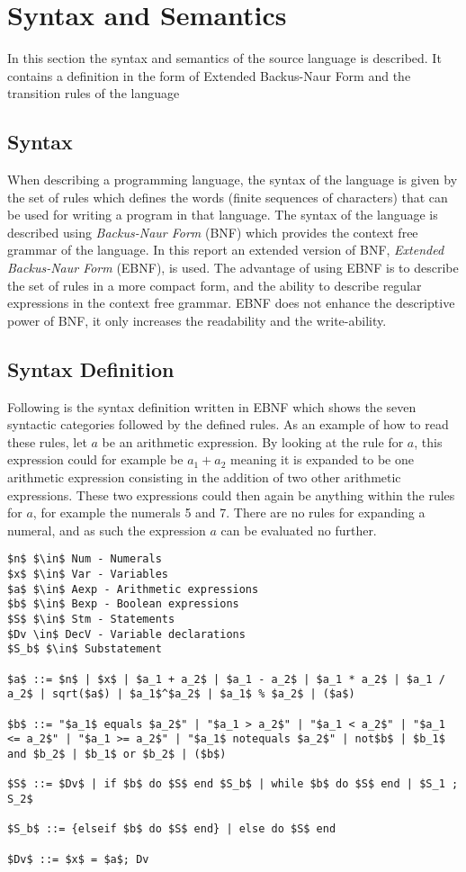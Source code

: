 \chapter{Syntax and Semantics}\label{analysis:syntax-and-semantics}
In this section the syntax and semantics of the source language is described. It contains a definition in the form of Extended Backus-Naur Form and the transition rules of the language

\section{Syntax}
When describing a programming language, the syntax of the language is given by the set of rules which defines the words (finite sequences of characters) that can be used for writing a program in that language. The syntax of the language is described using \textit{Backus-Naur Form} (BNF) which provides the context free grammar of the language.
In this report an extended version of BNF, \textit{Extended Backus-Naur Form} (EBNF), is used. The advantage of using EBNF is to describe the set of rules in a more compact form, and the ability to describe regular expressions in the context free grammar. EBNF does not enhance the descriptive power of BNF, it only increases the readability and the write-ability.

\section{Syntax Definition}\label{sec:anlysis:syntax-definition}
Following is the syntax definition written in EBNF which shows the seven syntactic categories followed by the defined rules. As an example of how to read these rules, let $a$ be an arithmetic expression. By looking at the rule for $a$, this expression could for example be $a_1 + a_2$ meaning it is expanded to be one arithmetic expression consisting in the addition of two other arithmetic expressions. These two expressions could then again be anything within the rules for $a$, for example the numerals 5 and 7. There are no rules for expanding a numeral, and as such the expression $a$ can be evaluated no further.
\begin{lstlisting}[mathescape, captionpos=b, caption=Syntax formation rules, label=lst:syntax-formation]
$n$ $\in$ Num - Numerals
$x$ $\in$ Var - Variables
$a$ $\in$ Aexp - Arithmetic expressions
$b$ $\in$ Bexp - Boolean expressions
$S$ $\in$ Stm - Statements
$Dv \in$ DecV - Variable declarations
$S_b$ $\in$ Substatement

$a$ ::= $n$ | $x$ | $a_1 + a_2$ | $a_1 - a_2$ | $a_1 * a_2$ | $a_1 / a_2$ | sqrt($a$) | $a_1$^$a_2$ | $a_1$ % $a_2$ | ($a$)

$b$ ::= "$a_1$ equals $a_2$" | "$a_1 > a_2$" | "$a_1 < a_2$" | "$a_1 <= a_2$" | "$a_1 >= a_2$" | "$a_1$ notequals $a_2$" | not$b$ | $b_1$ and $b_2$ | $b_1$ or $b_2$ | ($b$)

$S$ ::= $Dv$ | if $b$ do $S$ end $S_b$ | while $b$ do $S$ end | $S_1 ; S_2$

$S_b$ ::= {elseif $b$ do $S$ end} | else do $S$ end

$Dv$ ::= $x$ = $a$; Dv
\end{lstlisting}

